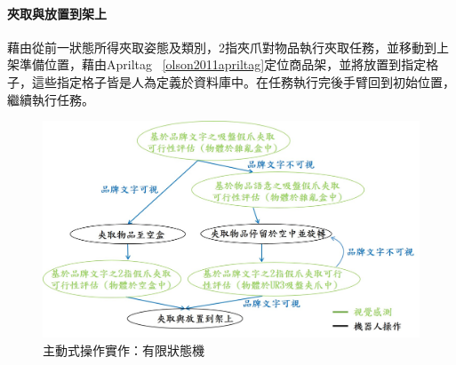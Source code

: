 \paragraph{夾取與放置到架上}
藉由從前一狀態所得夾取姿態及類別，2指夾爪對物品執行夾取任務，並移動到上架準備位置，藉由Apriltag ~\ref{olson2011apriltag}定位商品架，並將放置到指定格子，這些指定格子皆是人為定義於資料庫中。在任務執行完後手臂回到初始位置，繼續執行任務。


\begin{figure}[H]
	\centering
	\includegraphics[height=!, width=1.0\linewidth, keepaspectratio=true]
	{./figures/FSM.jpg}
  \caption{主動式操作實作：有限狀態機}
  \label{figure:fsm}
\end{figure}

